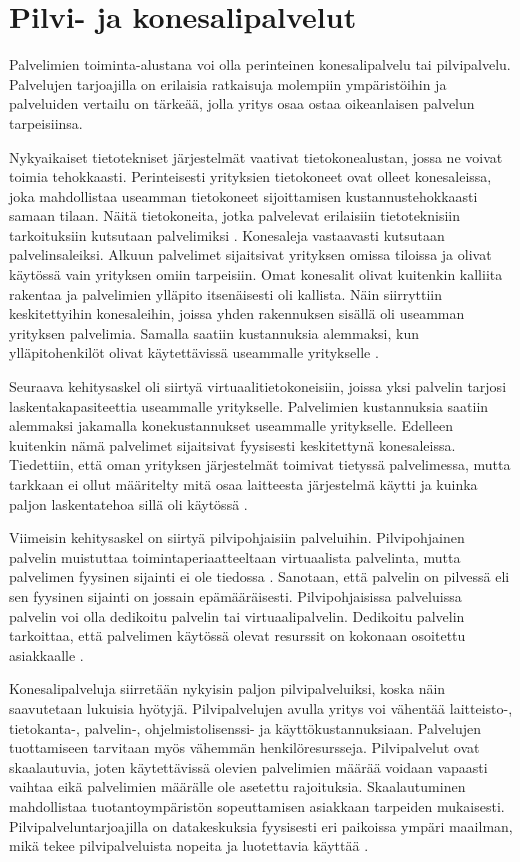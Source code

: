 \chapter{Pilvi- ja konesalipalvelut\label{konesalipalvelut}}
Palvelimien toiminta-alustana voi olla perinteinen konesalipalvelu tai pilvipalvelu. Palvelujen tarjoajilla on erilaisia ratkaisuja molempiin ympäristöihin ja palveluiden vertailu on tärkeää, jolla yritys osaa ostaa oikeanlaisen palvelun tarpeisiinsa. 

Nykyaikaiset tietotekniset järjestelmät vaativat tietokonealustan, jossa ne voivat toimia tehokkaasti. Perinteisesti yrityksien tietokoneet ovat olleet konesaleissa, joka mahdollistaa useamman tietokoneet sijoittamisen kustannustehokkaasti samaan tilaan. Näitä tietokoneita, jotka palvelevat erilaisiin tietoteknisiin tarkoituksiin kutsutaan palvelimiksi \citep{server_computing}. Konesaleja vastaavasti kutsutaan palvelinsaleiksi. Alkuun palvelimet sijaitsivat yrityksen omissa tiloissa ja olivat käytössä vain yrityksen omiin tarpeisiin. Omat konesalit olivat kuitenkin kalliita rakentaa ja palvelimien ylläpito itsenäisesti oli kallista. Näin siirryttiin keskitettyihin konesaleihin, joissa yhden rakennuksen sisällä oli useamman yrityksen palvelimia. Samalla saatiin kustannuksia alemmaksi, kun ylläpitohenkilöt olivat käytettävissä useammalle yritykselle \citep{server_room}.

Seuraava kehitysaskel oli siirtyä virtuaalitietokoneisiin, joissa yksi palvelin tarjosi laskentakapasiteettia useammalle yritykselle. Palvelimien kustannuksia saatiin alemmaksi jakamalla konekustannukset useammalle yritykselle. Edelleen kuitenkin nämä palvelimet sijaitsivat fyysisesti keskitettynä konesaleissa. Tiedettiin, että oman yrityksen järjestelmät toimivat tietyssä palvelimessa, mutta tarkkaan ei ollut määritelty mitä osaa laitteesta järjestelmä käytti ja kuinka paljon laskentatehoa sillä oli käytössä \citep{virtual_server}.

Viimeisin kehitysaskel on siirtyä pilvipohjaisiin palveluihin. Pilvipohjainen palvelin muistuttaa toimintaperiaatteeltaan virtuaalista palvelinta, mutta palvelimen fyysinen sijainti ei ole tiedossa \citep{cloud_computing}. Sanotaan, että palvelin on pilvessä eli sen fyysinen sijainti on jossain epämääräisesti. Pilvipohjaisissa palveluissa palvelin voi olla dedikoitu palvelin tai virtuaalipalvelin. Dedikoitu palvelin tarkoittaa, että palvelimen käytössä olevat resurssit on kokonaan osoitettu asiakkaalle \citep{dedicated_hosting}.

Konesalipalveluja siirretään nykyisin paljon pilvipalveluiksi, koska näin saavutetaan lukuisia hyötyjä. Pilvipalvelujen avulla yritys voi vähentää laitteisto-, tietokanta-, palvelin-, ohjelmistolisenssi- ja käyttökustannuksiaan. Palvelujen tuottamiseen tarvitaan myös vähemmän henkilöresursseja. Pilvipalvelut ovat skaalautuvia, joten käytettävissä olevien palvelimien määrää voidaan vapaasti vaihtaa eikä palvelimien määrälle ole asetettu rajoituksia. Skaalautuminen mahdollistaa tuotantoympäristön sopeuttamisen asiakkaan tarpeiden mukaisesti. Pilvipalveluntarjoajilla on datakeskuksia fyysisesti eri paikoissa ympäri maailman, mikä tekee pilvipalveluista nopeita ja luotettavia käyttää \citep{top_cloud}.

